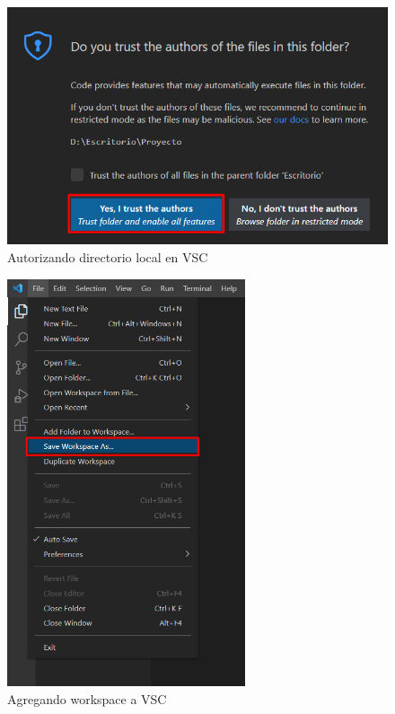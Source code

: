 \begin{figure}[H]
    \begin{center}
        \caption{Autorizando directorio local en VSC}
        \label{fig: 6}
        \includegraphics[width=12cm]{capturas/creando_w3.png}
    \end{center}
\end{figure}
\begin{figure}[H]
    \begin{center}
        \caption{Agregando workspace a VSC}
        \label{fig: 7}
        \includegraphics[width=7cm]{capturas/creando_w4.png}
    \end{center}
\end{figure}
